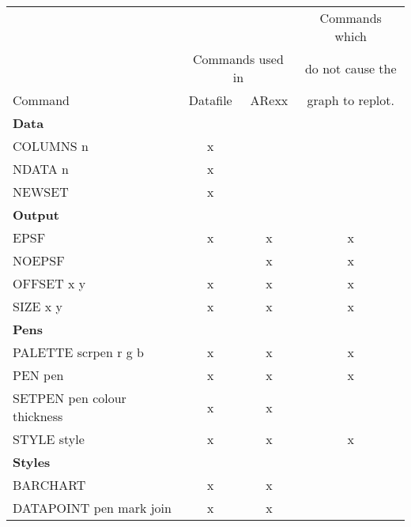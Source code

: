 \begin{center}
\scriptsize
\begin{tabular}{lccc} \hline
                                 &           &        & Commands which     \\
                                 & \multicolumn{2}{c}{Commands used in} %
                                                      & do not cause the   \\ \cline{2-3}
Command                          & Datafile  & ARexx  & graph to replot.   \\ \hline
{\bf Data}                       &           &        &                    \\
COLUMNS  n                       &     x     &        &                    \\
NDATA  n                         &     x     &        &                    \\
NEWSET                           &     x     &        &                    \\ \hline
{\bf Output}                     &           &        &                    \\
EPSF                             &     x     &     x  &       x            \\
NOEPSF                           &           &     x  &       x            \\
OFFSET  x   y                    &     x     &     x  &       x            \\
SIZE  x   y                      &     x     &     x  &       x            \\ \hline
{\bf Pens}                       &           &        &                    \\
PALETTE  scrpen   r   g  b       &     x     &     x  &       x            \\
PEN  pen                         &     x     &     x  &       x            \\
SETPEN  pen   colour   thickness &     x     &     x  &                    \\
STYLE  style                     &     x     &     x  &       x            \\ \hline
{\bf Styles}                     &           &        &                    \\
BARCHART                         &     x     &     x  &                    \\
DATAPOINT  pen   mark   join     &     x     &     x  &                    \\

\end{tabular}
\end{center}
